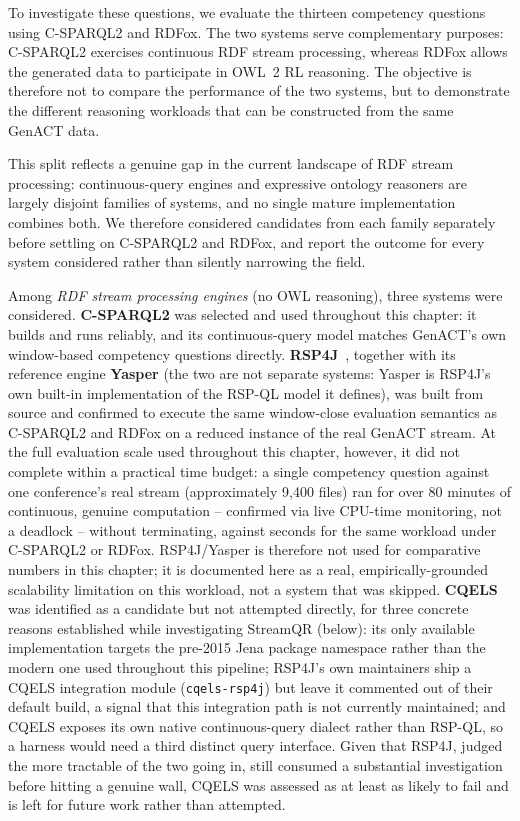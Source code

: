 To investigate these questions, we evaluate the thirteen competency questions
using C-SPARQL2 and RDFox. The two systems serve complementary purposes:
C-SPARQL2 exercises continuous RDF stream processing, whereas RDFox allows the
generated data to participate in OWL~2 RL reasoning. The objective is
therefore not to compare the performance of the two systems, but to
demonstrate the different reasoning workloads that can be constructed from the
same GenACT data.

This split reflects a genuine gap in the current landscape of RDF stream
processing: continuous-query engines and expressive ontology reasoners are
largely disjoint families of systems, and no single mature implementation
combines both. We therefore considered candidates from each family separately
before settling on C-SPARQL2 and RDFox, and report the outcome for every
system considered rather than silently narrowing the field.

Among \emph{RDF stream processing engines} (no OWL reasoning), three systems
were considered. \textbf{C-SPARQL2} was selected and used throughout this
chapter: it builds and runs reliably, and its continuous-query model matches
GenACT's own window-based competency questions directly.
\textbf{RSP4J}~\cite{rsp4j}, together with its reference engine
\textbf{Yasper} (the two are not separate systems: Yasper is RSP4J's own
built-in implementation of the RSP-QL model it defines), was built from
source and confirmed to execute the same window-close evaluation semantics as
C-SPARQL2 and RDFox on a reduced instance of the real GenACT stream. At the
full evaluation scale used throughout this chapter, however, it did not
complete within a practical time budget: a single competency question against
one conference's real stream (approximately 9{,}400 files) ran for over 80
minutes of continuous, genuine computation -- confirmed via live CPU-time
monitoring, not a deadlock -- without terminating, against seconds for the
same workload under C-SPARQL2 or RDFox. RSP4J/Yasper is therefore not used for
comparative numbers in this chapter; it is documented here as a real,
empirically-grounded scalability limitation on this workload, not a system
that was skipped. \textbf{CQELS}~\cite{cqel} was identified as a candidate but
not attempted directly, for three concrete reasons established while
investigating StreamQR (below): its only available implementation targets the
pre-2015 Jena package namespace rather than the modern one used throughout
this pipeline; RSP4J's own maintainers ship a CQELS integration module
(\texttt{cqels-rsp4j}) but leave it commented out of their default build, a
signal that this integration path is not currently maintained; and CQELS
exposes its own native continuous-query dialect rather than RSP-QL, so a
harness would need a third distinct query interface. Given that RSP4J, judged
the more tractable of the two going in, still consumed a substantial
investigation before hitting a genuine wall, CQELS was assessed as at least as
likely to fail and is left for future work rather than attempted.

